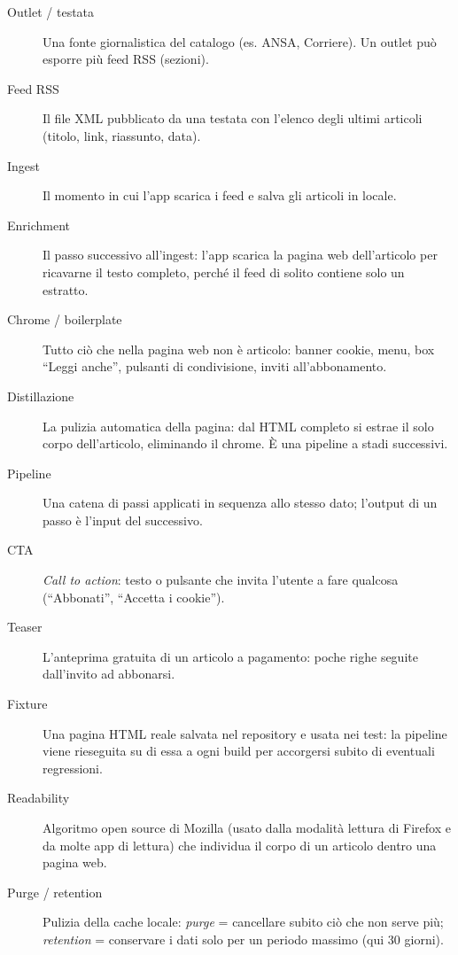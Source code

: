 \begin{description}
  \item[Outlet / testata] Una fonte giornalistica del catalogo (es.
        ANSA, Corriere). Un outlet può esporre più feed RSS (sezioni).
  \item[Feed RSS] Il file XML pubblicato da una testata con l'elenco
        degli ultimi articoli (titolo, link, riassunto, data).
  \item[Ingest] Il momento in cui l'app scarica i feed e salva gli
        articoli in locale.
  \item[Enrichment] Il passo successivo all'ingest: l'app scarica la
        pagina web dell'articolo per ricavarne il testo completo,
        perché il feed di solito contiene solo un estratto.
  \item[Chrome / boilerplate] Tutto ciò che nella pagina web non è
        articolo: banner cookie, menu, box ``Leggi anche'', pulsanti
        di condivisione, inviti all'abbonamento.
  \item[Distillazione] La pulizia automatica della pagina: dal
        HTML completo si estrae il solo corpo dell'articolo,
        eliminando il chrome. È una pipeline a stadi successivi.
  \item[Pipeline] Una catena di passi applicati in sequenza allo
        stesso dato; l'output di un passo è l'input del successivo.
  \item[CTA] \emph{Call to action}: testo o pulsante che invita
        l'utente a fare qualcosa (``Abbonati'', ``Accetta i cookie'').
  \item[Teaser] L'anteprima gratuita di un articolo a pagamento:
        poche righe seguite dall'invito ad abbonarsi.
  \item[Fixture] Una pagina HTML reale salvata nel repository e usata
        nei test: la pipeline viene rieseguita su di essa a ogni build
        per accorgersi subito di eventuali regressioni.
  \item[Readability] Algoritmo open source di Mozilla (usato dalla
        modalità lettura di Firefox e da molte app di lettura) che
        individua il corpo di un articolo dentro una pagina web.
  \item[Purge / retention] Pulizia della cache locale: \emph{purge} =
        cancellare subito ciò che non serve più; \emph{retention} =
        conservare i dati solo per un periodo massimo (qui 30 giorni).
\end{description}


